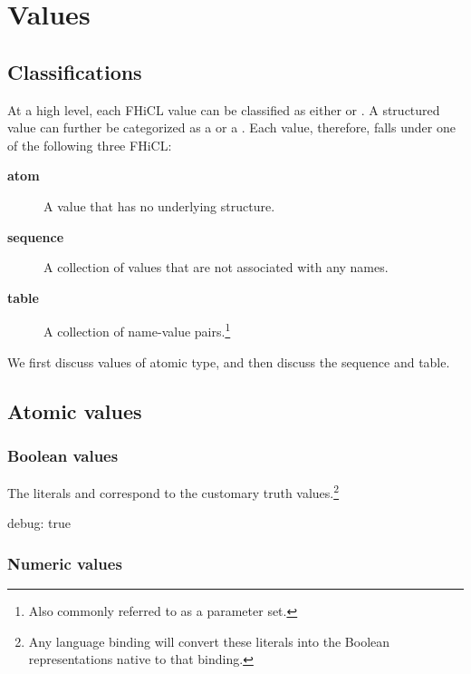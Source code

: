\documentclass{memarticle}
\newcommand{\fhicl}{FHiCL\xspace}
\begin{document}
\chapter{Values}

\section{Classifications}

At a high level, each \fhicl value can be classified as either
 or .  A structured value can further be
categorized as a  or a .  Each value,
therefore, falls under one of the following three \fhicl {}:

\begin{description}
\item [\textbf{atom}] A value that has no underlying structure.
\item [\textbf{sequence}] A collection of values that are not associated with any names.
\item [\textbf{table}] A collection of name-value pairs.\footnote{Also commonly referred to as a parameter set.}
\end{description}

We first discuss values of atomic type, and then discuss the sequence
and table.

\section{Atomic values}

\subsection{Boolean values}

The literals  and  correspond to the
customary truth values.\footnote{Any language binding will convert
  these literals into the Boolean representations native to that binding.}
%
\Needspace{0.17in}
\begin{fcllisting}[texcl,escapechar=`]
debug: true
\end{fcllisting}

\subsection{Numeric values}
%
\end{document}
